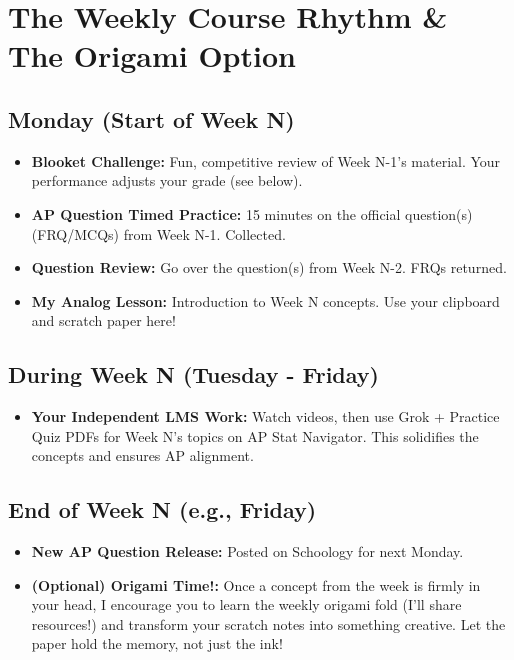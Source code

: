 \documentclass[11pt]{article}
\begin{document}
\section{The Weekly Course Rhythm \& The Origami Option}

\subsection{Monday (Start of Week N)}

\begin{itemize}[leftmargin=*]
  \item \textbf{Blooket Challenge:} Fun, competitive review of Week N-1's material. Your performance adjusts your grade (see below).
  
  \item \textbf{AP Question Timed Practice:} 15 minutes on the official question(s) (FRQ/MCQs) from Week N-1. Collected.
  
  \item \textbf{Question Review:} Go over the question(s) from Week N-2. FRQs returned.
  
  \item \textbf{My Analog Lesson:} Introduction to Week N concepts. Use your clipboard and scratch paper here!
\end{itemize}

\subsection{During Week N (Tuesday - Friday)}

\begin{itemize}[leftmargin=*]
  \item \textbf{Your Independent LMS Work:} Watch videos, then use Grok + Practice Quiz PDFs for Week N's topics on AP Stat Navigator. This solidifies the concepts and ensures AP alignment.
\end{itemize}

\subsection{End of Week N (e.g., Friday)}

\begin{itemize}[leftmargin=*]
  \item \textbf{New AP Question Release:} Posted on Schoology for next Monday.
  
  \item \textbf{(Optional) Origami Time!:} Once a concept from the week is firmly in your head, I encourage you to learn the weekly origami fold (I'll share resources!) and transform your scratch notes into something creative. Let the paper hold the memory, not just the ink!
\end{itemize}
\end{document}
